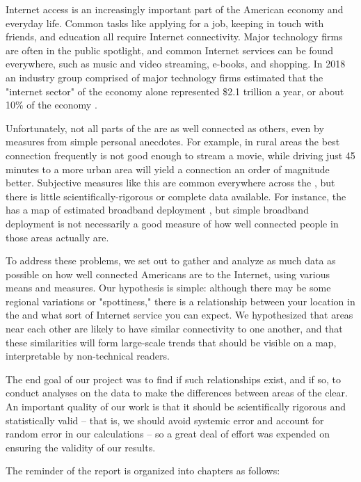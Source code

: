 Internet access is an increasingly important part of the American economy and everyday life. Common tasks like applying for a job, keeping in touch with friends, and education all require Internet connectivity. Major technology firms are often in the public spotlight, and common Internet services can be found everywhere, such as music and video streaming, e-books, and shopping. In 2018 an industry group comprised of major technology firms estimated that the "internet sector" of the economy alone represented \$2.1 trillion a year, or about 10\% of the \us economy \cite{Shepardson2019a}.

Unfortunately, not all parts of the \us are as well connected as others, even by measures from simple personal anecdotes. For example, in rural areas the best connection frequently is not good enough to stream a movie, while driving just 45 minutes to a more urban area will yield a connection an order of magnitude better. Subjective measures like this are common everywhere across the \us, but there is little scientifically-rigorous or complete data available. For instance, the \fcc has a map of estimated broadband deployment \cite{FederalCommunicationsCommission}, but simple broadband deployment is not necessarily a good measure of how well connected people in those areas actually are.

To address these problems, we set out to gather and analyze as much data as possible on how well connected Americans are to the Internet, using various means and measures. Our hypothesis is simple: although there may be some regional variations or "spottiness," there is a relationship between your location in the \us and what sort of Internet service you can expect. We hypothesized that areas near each other are likely to have similar connectivity to one another, and that these similarities will form large-scale trends that should be visible on a map, interpretable by non-technical readers.

The end goal of our project was to find if such relationships exist, and if so, to conduct analyses on the data to make the differences between areas of the \us clear. An important quality of our work is that it should be scientifically rigorous and statistically valid -- that is, we should avoid systemic error and account for random error in our calculations -- so a great deal of effort was expended on ensuring the validity of our results.

The reminder of the report is organized into chapters as follows:

